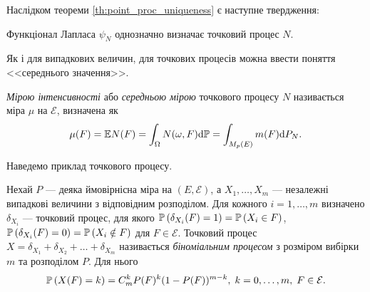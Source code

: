 Наслідком теореми \ref{th:point_proc_uniqueness} є наступне твердження:
\begin{theorem}
    Функціонал Лапласа $\psi_N$ однозначно визначає точковий процес $N$.
\end{theorem}

Як і для випадкових величин, для
точкових процесів можна ввести поняття <<середнього значення>>.
\begin{definition}
    \emph{Мірою інтенсивності} або \emph{середньою мірою} точкового процесу $N$
    називається міра $\mu$ на $\mathcal{E}$, визначена як
    $$
        \mu(F) = \E N(F) = \int_{\Omega} N(\omega, F) \d\mathbb{P} = 
        \int_{M_p(E)} m(F) \d P_N.
    $$
\end{definition}

Наведемо приклад точкового процесу.
\begin{definition}
    Нехай $P$ --- деяка ймовірнісна міра на $\left(E, \mathcal{E}\right)$, а
    $X_1, \dots, X_m$ --- незалежні випадкові величини з відповідним розподілом.
    Для кожного $i = 1, \dots, m$ визначено $\delta_{X_i}$ --- точковий процес,
    для якого $\P{\delta_{X_i}(F) = 1} = \P{X_i \in F}$,
    $\P{\delta_{X_i}(F) = 0} = \P{X_i \notin F}$ для $F \in \mathcal{E}$.
    Точковий процес $X = \delta_{X_1} + \delta_{X_2} + \dots + \delta_{X_m}$
    називається \emph{біноміальним процесом}
    з розміром вибірки $m$ та розподілом $P$. Для нього
    $$
        \P{X(F) = k} = C_m^k P(F)^k (1 - P(F))^{m-k}, \; k = 0,\dots,m, \; F \in \mathcal{E}.
    $$
\end{definition}

